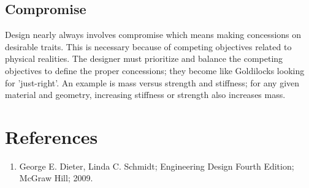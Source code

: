 \documentclass[12pt]{article}
\begin{document}
\subsection{Compromise}
Design nearly always involves compromise which means making concessions on desirable traits.
This is necessary because of competing objectives related to physical realities.
The designer must prioritize and balance the competing objectives to define the proper concessions; they become like Goldilocks looking for 'just-right'.
An example is mass versus strength and stiffness; for any given material and geometry, increasing stiffness or strength also increases mass.


\section*{References}

\begin{enumerate}
    \item George E. Dieter, Linda C. Schmidt; Engineering Design Fourth Edition; McGraw Hill; 2009.
\end{enumerate}
\end{document}
